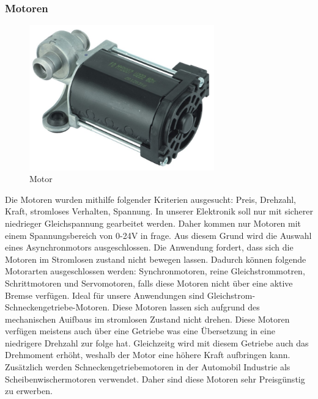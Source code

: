 \subsubsection{Motoren}
\begin{figure}[H] 
\begin{center}

\includegraphics[width=8cm]{Bilder/Bauteile/Motor}
\caption{Motor}
\label{Motor}

\end{center}
\end{figure}
Die Motoren wurden mithilfe folgender Kriterien ausgesucht: Preis, Drehzahl, Kraft, stromloses Verhalten, Spannung.
In unserer Elektronik soll nur mit sicherer niedrieger Gleichspannung gearbeitet werden. Daher kommen nur Motoren mit einem Spannungsbereich von 0-24V in frage. Aus diesem Grund wird die Auswahl eines Asynchronmotors ausgeschlossen. Die Anwendung fordert, dass sich die Motoren im Stromlosen zustand nicht bewegen lassen. Dadurch können folgende Motorarten ausgeschlossen werden: Synchronmotoren, reine Gleichstrommotren, Schrittmotoren und Servomotoren, falls diese Motoren nicht über eine aktive Bremse verfügen. Ideal für unsere Anwendungen sind Gleichstrom-Schneckengetriebe-Motoren. Diese Motoren lassen sich aufgrund des mechanischen Auifbaus im stromlosen Zustand nicht drehen. Diese Motoren verfügen meistens auch über eine Getriebe was eine Übersetzung in eine niedrigere Drehzahl zur folge hat. Gleichzeitg wird mit diesem Getriebe auch das Drehmoment erhöht, weshalb der Motor eine höhere Kraft aufbringen kann. Zusätzlich werden Schneckengetriebemotoren in der Automobil Industrie als Scheibenwischermotoren verwendet. Daher sind diese Motoren sehr Preisgünstig zu erwerben.


